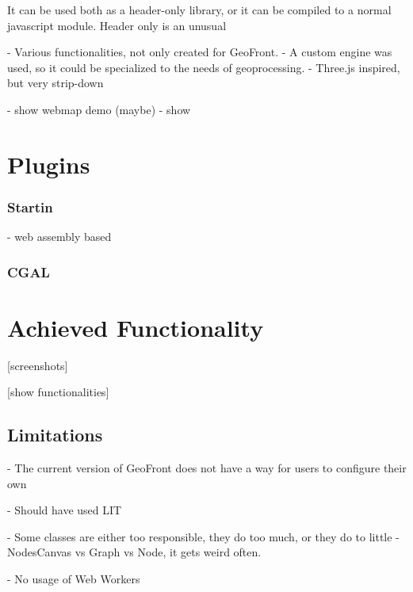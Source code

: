 It can be used both as a header-only library, or it can be compiled to a normal javascript module. 
Header only is an unusual 

- Various functionalities, not only created for GeoFront.
- A custom engine was used, so it could be specialized to the needs of geoprocessing. 
- Three.js inspired, but very strip-down

- show webmap demo (maybe)
- show 


\section{ Plugins }


\subsubsection{ Startin }
- web assembly based

\subsubsection{ CGAL }


\section{Achieved Functionality}

[screenshots]

[show functionalities]


\subsection{Limitations}
- The current version of GeoFront does not have a way for users to configure their own

- Should have used LIT

- Some classes are either too responsible, they do too much, or they do to little
  - NodesCanvas vs Graph vs Node, it gets weird often.

- No usage of Web Workers